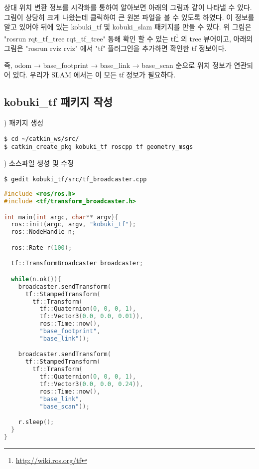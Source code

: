 상대 위치 변환 정보를 시각화를 통하여 알아보면 아래의 그림과 같이 나타낼 수 있다. 그림이 상당히 크게 나왔는데 클릭하여 큰 원본 파일을 볼 수 있도록 하였다. 이 정보를 알고 있어야 뒤에 있는 kobuki\_tf 및 kobuki\_slam 패키지를 만들 수 있다. 위 그림은 "rosrun rqt\_tf\_tree rqt\_tf\_tree" 통해 확인 할 수 있는 tf\footnote{\url{http://wiki.ros.org/tf}} 의 tree 뷰어이고, 아래의 그림은 "rosrun rviz rviz" 에서 "tf" 플러그인을 추가하면 확인한 tf 정보이다. 

즉, odom → base\_footprint → base\_link → base\_scan 순으로 위치 정보가 연관되어 있다. 우리가 SLAM 에서는 이 모든 tf 정보가 필요하다.

\subsection{kobuki\_tf 패키지 작성}

\setcounter{num}{0}

\vspace{\baselineskip}
\noindent
{}
\thenum) 패키지 생성

\vspace{\baselineskip}
\begin{lstlisting}[language=ROS]
$ cd ~/catkin_ws/src/
$ catkin_create_pkg kobuki_tf roscpp tf geometry_msgs
\end{lstlisting}


\vspace{\baselineskip}
\noindent
{}
\thenum) 소스파일 생성 및 수정

\vspace{\baselineskip}
\begin{lstlisting}[language=ROS]
$ gedit kobuki_tf/src/tf_broadcaster.cpp 
\end{lstlisting}


\vspace{\baselineskip}
\begin{lstlisting}[language=C++]
#include <ros/ros.h>
#include <tf/transform_broadcaster.h>

int main(int argc, char** argv){
  ros::init(argc, argv, "kobuki_tf");
  ros::NodeHandle n;

  ros::Rate r(100);

  tf::TransformBroadcaster broadcaster;

  while(n.ok()){
    broadcaster.sendTransform(
      tf::StampedTransform(
        tf::Transform(
          tf::Quaternion(0, 0, 0, 1),
          tf::Vector3(0.0, 0.0, 0.01)),
          ros::Time::now(),
          "base_footprint",
          "base_link"));

    broadcaster.sendTransform(
      tf::StampedTransform(
        tf::Transform(
          tf::Quaternion(0, 0, 0, 1),
          tf::Vector3(0.0, 0.0, 0.24)),
          ros::Time::now(),
          "base_link",
          "base_scan"));

    r.sleep();
  }
}
\end{lstlisting}


